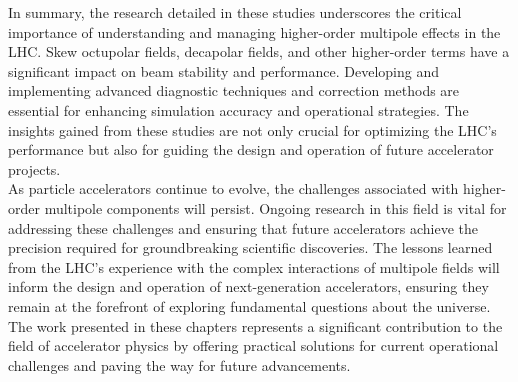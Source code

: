 {%
In summary, the research detailed in these studies underscores the critical importance of
understanding and managing higher-order multipole effects in the LHC. Skew octupolar fields,
decapolar fields, and other higher-order terms have a significant impact on beam stability and
performance. Developing and implementing advanced diagnostic techniques and correction methods are
essential for enhancing simulation accuracy and operational strategies. The insights gained from
these studies are not only crucial for optimizing the LHC's performance but also for guiding the
design and operation of future accelerator projects.\\
\indent
As particle accelerators continue to evolve, the challenges associated with higher-order multipole
components will persist. Ongoing research in this field is vital for addressing these challenges and
ensuring that future accelerators achieve the precision required for groundbreaking scientific
discoveries. The lessons learned from the LHC's experience with the complex interactions of
multipole fields will inform the design and operation of next-generation accelerators, ensuring they
remain at the forefront of exploring fundamental questions about the universe.\\
\indent
The work presented in these chapters represents a significant contribution to the field of
accelerator physics by offering practical solutions for current operational challenges and paving
the way for future advancements.

} %


\chapter{}

